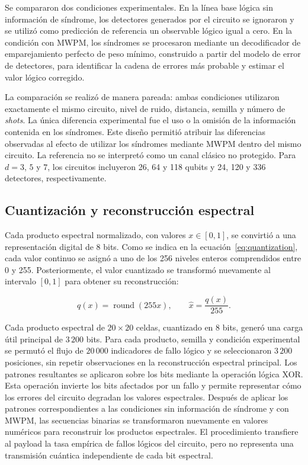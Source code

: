 \documentclass[fleqn,10pt]{wlscirep}
\begin{document}
Se compararon dos condiciones experimentales. En la línea base lógica sin información de síndrome,
los detectores generados por el circuito se ignoraron y
se utilizó como predicción de referencia un observable lógico igual a cero.
En la condición con MWPM, los síndromes se procesaron mediante un
decodificador de emparejamiento perfecto de peso mínimo, construido a
partir del modelo de error de detectores, para identificar la cadena
de errores más probable y estimar el valor lógico corregido.

La comparación se realizó de manera pareada: ambas condiciones
utilizaron exactamente el mismo circuito, nivel de ruido, distancia,
semilla y número de \textit{shots}. La única diferencia experimental
fue el uso o la omisión de la información contenida en los síndromes.
Este diseño permitió atribuir las diferencias observadas al efecto de
utilizar los síndromes mediante MWPM dentro del mismo circuito. La referencia no se interpretó como un canal clásico no protegido. Para $d=3$, $5$ y $7$, los circuitos incluyeron 26, 64 y 118 qubits y 24, 120 y 336 detectores, respectivamente.

\subsection*{Cuantización y reconstrucción espectral}

Cada producto espectral normalizado, con valores $x\in[0,1]$, se
convirtió a una representación digital de 8 bits. Como se indica en la
ecuación~\ref{eq:quantization}, cada valor continuo se asignó a uno de
los 256 niveles enteros comprendidos entre 0 y 255. Posteriormente, el
valor cuantizado se transformó nuevamente al intervalo $[0,1]$ para
obtener su reconstrucción:

\begin{equation}
q(x)=\operatorname{round}(255x),
\qquad
\hat{x}=\frac{q(x)}{255}.
\label{eq:quantization}
\end{equation}

Cada producto espectral de $20\times20$ celdas, cuantizado en 8 bits, generó una carga útil principal de $3\,200$ bits. Para cada producto, semilla y condición experimental se permutó el flujo de $20\,000$ indicadores de fallo lógico y se seleccionaron $3\,200$ posiciones, sin repetir observaciones en la reconstrucción espectral principal. Los patrones resultantes se aplicaron sobre
los bits mediante la operación lógica XOR. Esta operación invierte los
bits afectados por un fallo y permite representar cómo los errores del
circuito degradan los valores espectrales. Después de aplicar los
patrones correspondientes a las condiciones sin información de síndrome y con
MWPM, las secuencias binarias se transformaron nuevamente en valores
numéricos para reconstruir los productos espectrales. El procedimiento transfiere al payload la tasa empírica de fallos lógicos del circuito, pero no representa una transmisión cuántica independiente de cada bit espectral.
\end{document}
